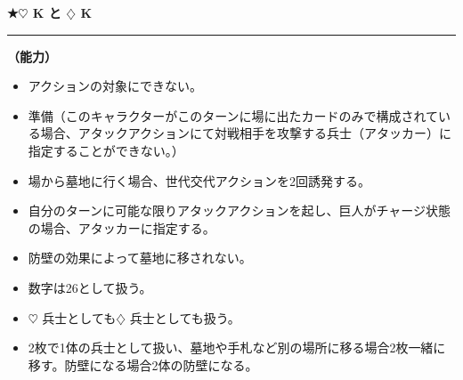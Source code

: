 \documentclass[twocolumn,a5paper,papersize,10pt]{jarticle}
\begin{document}
 
\vspace{2mm}
\begin{tcolorbox}[title={\small\bf【Character】巨人}{\scriptsize （兵士）}]

  {\scriptsize\bf ★{\normalsize $\heartsuit$} K と {\normalsize $\diamondsuit$} K}

\vspace{1mm} %
\hrule height 0.1mm depth 0mm width 62mm %
\vspace{1mm} %

{\bf（能力）}


\vspace{-1zh}%
\begin{itemize}
\setlength{\leftskip}{-0.3cm}
\setlength{\parskip}{0pt} %

\item アクションの対象にできない。

\item 準備（このキャラクターがこのターンに場に出たカードのみで構成されている場合、アタックアクションにて対戦相手を攻撃する兵士（アタッカー）に指定することができない。）

\item 場から墓地に行く場合、世代交代アクションを2回誘発する。

\item 自分のターンに可能な限りアタックアクションを起し、巨人がチャージ状態の場合、アタッカーに指定する。

\item 防壁の効果によって墓地に移されない。

\item 数字は26として扱う。

\item {\normalsize $\heartsuit$} 兵士としても{\normalsize $\diamondsuit$} 兵士としても扱う。

\item 2枚で1体の兵士として扱い、墓地や手札など別の場所に移る場合2枚一緒に移す。防壁になる場合2体の防壁になる。
\vspace{-1zh}%
\end{itemize}

\vspace{1mm} %
\end{tcolorbox}

\vspace{-1zh}

 
 
 
 
\end{document}
